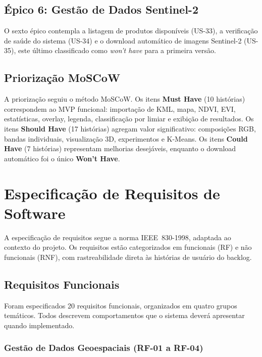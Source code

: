 \documentclass[12pt, a4paper]{article}
\begin{document}
\subsection{Épico 6: Gestão de Dados Sentinel-2}

O sexto épico contempla a listagem de produtos disponíveis (US-33), a verificação de saúde do sistema (US-34) e o download automático de imagens Sentinel-2 (US-35), este último classificado como \textit{won't have} para a primeira versão.

\subsection{Priorização MoSCoW}

A priorização seguiu o método MoSCoW. Os itens \textbf{Must Have} (10 histórias) correspondem ao MVP funcional: importação de KML, mapa, NDVI, EVI, estatísticas, overlay, legenda, classificação por limiar e exibição de resultados. Os itens \textbf{Should Have} (17 histórias) agregam valor significativo: composições RGB, bandas individuais, visualização 3D, experimentos e K-Means. Os itens \textbf{Could Have} (7 histórias) representam melhorias desejáveis, enquanto o download automático foi o único \textbf{Won't Have}.

\section{Especificação de Requisitos de Software}

A especificação de requisitos segue a norma IEEE~830-1998, adaptada ao contexto do projeto. Os requisitos estão categorizados em funcionais (RF) e não funcionais (RNF), com rastreabilidade direta às histórias de usuário do backlog.

\subsection{Requisitos Funcionais}

Foram especificados 20 requisitos funcionais, organizados em quatro grupos temáticos. Todos descrevem comportamentos que o sistema deverá apresentar quando implementado.

\subsubsection{Gestão de Dados Geoespaciais (RF-01 a RF-04)}
\end{document}
